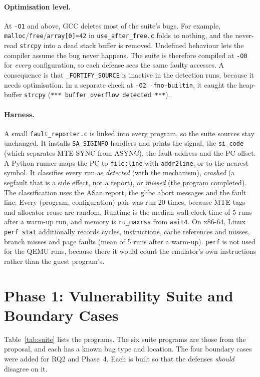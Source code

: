 \documentclass[11pt,a4paper]{article}
\begin{document}
\paragraph{Optimisation level.}
At \texttt{-O1} and above, GCC deletes most of the suite's bugs.
For example, \texttt{malloc}/\texttt{free}/\texttt{array[0]=42} in \texttt{use\_after\_free.c} folds to nothing, and the never-read \texttt{strcpy} into a dead stack buffer is removed.
Undefined behaviour lets the compiler assume the bug never happens.
The suite is therefore compiled at \texttt{-O0} for \emph{every} configuration, so each defense sees the same faulty accesses.
A consequence is that \texttt{\_FORTIFY\_SOURCE} is inactive in the detection runs, because it needs optimisation.
In a separate check at \texttt{-O2 -fno-builtin}, it caught the heap-buffer \texttt{strcpy} (\texttt{*** buffer overflow detected ***}).

\paragraph{Harness.}
A small \texttt{fault\_reporter.c} is linked into every program, so the suite sources stay unchanged.
It installs \texttt{SA\_SIGINFO} handlers and prints the signal, the \texttt{si\_code} (which separates MTE SYNC from ASYNC), the fault address and the PC offset.
A Python runner maps the PC to \texttt{file:line} with \texttt{addr2line}, or to the nearest symbol.
It classifies every run as \emph{detected} (with the mechanism), \emph{crashed} (a segfault that is a side effect, not a report), or \emph{missed} (the program completed).
The classification uses the ASan report, the glibc abort messages and the fault line.
Every (program, configuration) pair was run 20 times, because MTE tags and allocator reuse are random.
Runtime is the median wall-clock time of 5 runs after a warm-up run, and memory is \texttt{ru\_maxrss} from \texttt{wait4}.
On x86-64, Linux \texttt{perf stat} additionally records cycles, instructions, cache references and misses, branch misses and page faults (mean of 5 runs after a warm-up).
\texttt{perf} is not used for the QEMU runs, because there it would count the emulator's own instructions rather than the guest program's.

\section{Phase 1: Vulnerability Suite and Boundary Cases}
Table~\ref{tab:suite} lists the programs.
The six suite programs are those from the proposal, and each has a known bug type and location.
The four boundary cases were added for RQ2 and Phase~4.
Each is built so that the defenses \emph{should} disagree on it.
\end{document}
